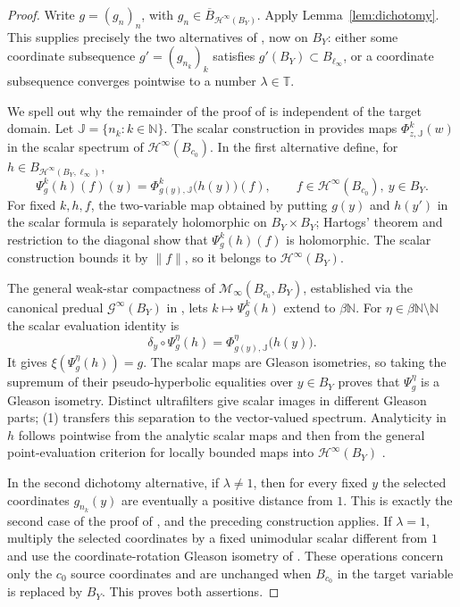 \documentclass[11pt]{article}
\newcommand{\N}{\mathbb N}
\newcommand{\T}{\mathbb T}
\newcommand{\Hinf}{\mathcal H^\infty}
\newcommand{\Minf}{\mathcal M_\infty}
\begin{document}
\begin{proof}
Write $g=(g_n)_n$, with
$g_n\in\overline B_{\Hinf(B_Y)}$.  Apply
Lemma~\ref{lem:dichotomy}.  This supplies precisely the two alternatives of
\cite[Lemma 2.2]{DimantSingerPolydisk}, now on $B_Y$:
either some coordinate subsequence $g'=(g_{n_k})_k$ satisfies
$g'(B_Y)\subset B_{\ell_\infty}$, or a coordinate subsequence converges
pointwise to a number $\lambda\in\T$.

We spell out why the remainder of the proof of
\cite[Theorem 2.4]{DimantSingerPolydisk} is independent of the target domain.
Let $\mathbb J=\{n_k:k\in\N\}$.  The scalar construction in
\cite[Theorem 1.1 and its proof]{DimantSingerPolydisk} provides maps
$\Phi^k_{z,\mathbb J}(w)$ in the scalar spectrum of $\Hinf(B_{c_0})$.
In the first alternative define, for
$h\in B_{\Hinf(B_Y,\ell_\infty)}$,
\[
 \Psi_g^k(h)(f)(y)
   =\Phi^k_{g(y),\mathbb J}\bigl(h(y)\bigr)(f),
 \qquad f\in\Hinf(B_{c_0}),\ y\in B_Y.
\]
For fixed $k,h,f$, the two-variable map obtained by putting $g(y)$ and
$h(y')$ in the scalar formula is separately holomorphic on
$B_Y\times B_Y$; Hartogs' theorem and restriction to the diagonal show that
$\Psi_g^k(h)(f)$ is holomorphic.  The scalar construction bounds it by
$\|f\|$, so it belongs to $\Hinf(B_Y)$.

The general weak-star compactness of $\Minf(B_{c_0},B_Y)$, established via
the canonical predual $\mathcal G^\infty(B_Y)$ in
\cite[Section 2]{DimantSingerFibered}, lets $k\mapsto\Psi_g^k(h)$ extend to
$\beta\N$.  For $\eta\in\beta\N\setminus\N$ the scalar evaluation identity
is
\[
 \delta_y\circ\Psi_g^\eta(h)
   =\Phi^\eta_{g(y),\mathbb J}\bigl(h(y)\bigr).
 \tag{1}
\]
It gives $\xi(\Psi_g^\eta(h))=g$.  The scalar maps are Gleason isometries,
so taking the supremum of their pseudo-hyperbolic equalities over
$y\in B_Y$ proves that $\Psi_g^\eta$ is a Gleason isometry.  Distinct
ultrafilters give scalar images in different Gleason parts; (1) transfers
this separation to the vector-valued spectrum.  Analyticity in $h$ follows
pointwise from the analytic scalar maps and then from the general
point-evaluation criterion for locally bounded maps into $\Hinf(B_Y)$
\cite[Lemma 2.3]{DimantSingerFibered}.

In the second dichotomy alternative, if $\lambda\ne1$, then for every fixed
$y$ the selected coordinates $g_{n_k}(y)$ are eventually a positive distance
from $1$.  This is exactly the second case of the proof of
\cite[Theorem 2.4]{DimantSingerPolydisk}, and the preceding construction
applies.  If $\lambda=1$, multiply the selected coordinates by a fixed
unimodular scalar different from $1$ and use the coordinate-rotation Gleason
isometry of \cite[Lemma 2.3]{DimantSingerPolydisk}.  These operations concern
only the $c_0$ source coordinates and are unchanged when $B_{c_0}$ in the
target variable is replaced by $B_Y$.  This proves both assertions.
\end{proof}
\end{document}
